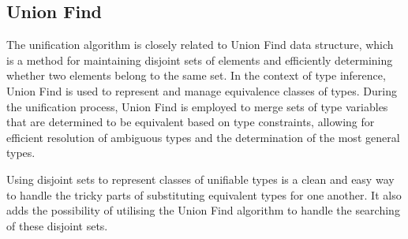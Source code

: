 \documentclass{l4proj}
\begin{document}



\subsection*{Union Find}
The unification algorithm is closely related to Union Find data structure, which is a method for maintaining disjoint sets of elements and efficiently determining whether two elements belong to the same set.
In the context of type inference, Union Find is used to represent and manage equivalence classes of types.
During the unification process, Union Find is employed to merge sets of type variables that are determined to be equivalent based on type constraints, allowing for efficient resolution of ambiguous types and the determination of the most general types.

Using disjoint sets to represent classes of unifiable types is a clean and easy way to handle the tricky parts of substituting equivalent types for one another.
It also adds the possibility of utilising the Union Find algorithm to handle the searching of these disjoint sets.


\end{document}
